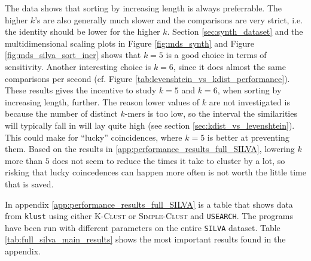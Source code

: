 The data shows that sorting by increasing length is always preferrable. The
higher $k$'s are also generally much slower and the comparisons are very
strict, i.e. the identity should be lower for the higher $k$. Section
\ref{sec:synth_dataset} and the multidimensional scaling plots in Figure
\ref{fig:mds_synth} and Figure \ref{fig:mds_silva_sort_incr} shows that $k=5$
is a good choice in terms of sensitivity. Another interesting choice is $k=6$,
since it does almost the same comparisons per second (cf. Figure
\ref{tab:levenshtein_vs_kdist_performance}). These results gives the incentive
to study $k=5$ and $k=6$, when sorting by increasing length, further. The
reason lower values of $k$ are not investigated is because the number of
distinct $k$-mers is too low, so the interval the similarities will typically
fall in will lay quite high (see section \ref{sec:kdist_vs_levenshtein}). This
could make for ``lucky'' coincidences, where $k=5$ is better at preventing
them. Based on the results in \ref{app:performance_results_full_SILVA},
lowering $k$ more than $5$ does not seem to reduce the times it take to
cluster by a lot, so risking that lucky coincedences can happen more often is
not worth the little time that is saved.

In appendix \ref{app:performance_results_full_SILVA} is a table that shows data
from \texttt{klust} using either \textsc{K-Clust} or \textsc{Simple-Clust} and
\texttt{USEARCH}. The programs have been run with different parameters on the
entire \texttt{SILVA} dataset. Table \ref{tab:full_silva_main_results} shows
the most important results found in the appendix.

